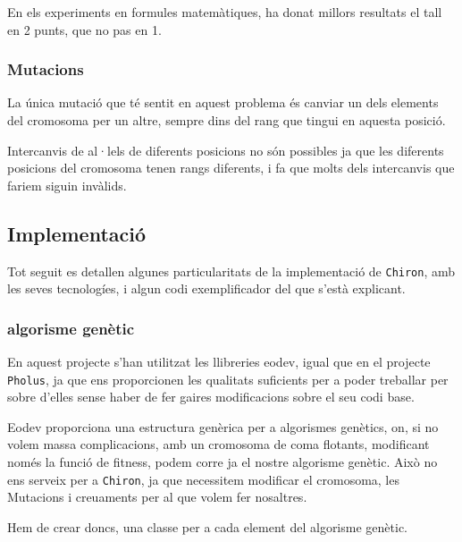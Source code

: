 \documentclass[titlepage,a4paper,12pt]{book}
\begin{document}
En els experiments en formules matemàtiques, ha donat millors resultats el tall
en 2 punts, que no pas en 1.


\subsubsection{Mutacions} %
\label{ssub:Mutacions}

La única mutació que té sentit en aquest problema és canviar un dels elements
del cromosoma per un altre, sempre dins del rang que tingui en aquesta posició.

Intercanvis de al·lels de diferents posicions no són possibles ja que les
diferents posicions del cromosoma tenen rangs diferents, i fa que molts dels
intercanvis que fariem siguin invàlids.


\subsection{Implementació} %
	\label{sub:Implementacio}

Tot seguit es detallen algunes particularitats de la implementació de
\texttt{Chiron}, amb les seves tecnologíes, i algun codi exemplificador del que
s'està explicant.

\subsubsection{algorisme genètic} %
\label{ssub:algorisme genetic}

En aquest projecte s'han utilitzat les llibreries eodev, igual que en el
projecte \texttt{Pholus}, ja que ens proporcionen les qualitats suficients per a
poder treballar per sobre d'elles sense haber de fer gaires modificacions sobre
el seu codi base.

Eodev proporciona una estructura genèrica per a algorismes genètics, on, si no
volem massa complicacions, amb un cromosoma de coma flotants, modificant només
la funció de fitness, podem corre ja el nostre algorisme genètic.  Això no ens
serveix per a \texttt{Chiron}, ja que necessitem modificar el cromosoma, les
Mutacions i creuaments per al que volem fer nosaltres.

Hem de crear doncs, una classe per a cada element del algorisme genètic.



\end{document}
